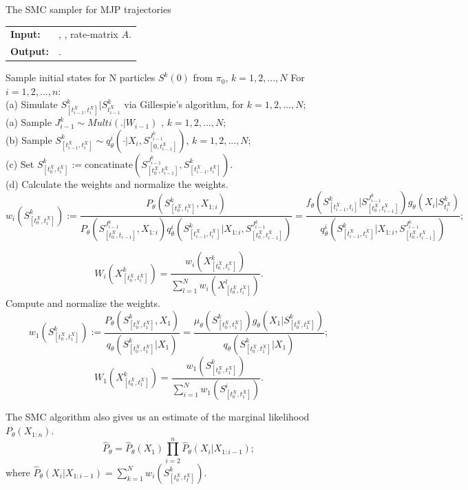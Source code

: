 \begin{algorithm}[H]
  \caption{The SMC sampler for MJP trajectories}
   \label{alg:SMC}
  \begin{tabular}{l l}
   \textbf{Input:  } & \text{Prior $\pi_0$, observations $X$}, 
                       \text{Number of particles $N$}, rate-matrix $A$.\\
   \textbf{Output:  }& \text{New MJP trajectory $S' (t) = (s'_0, S', T')$}.\\
   \hline
   \end{tabular}
   \begin{algorithmic}[1]
\State 
Sample initial states for N particles $S^k(0)$ from $\pi_0$, $k = 1,2,...,N$ 
\State For $i = 1, 2, ..., n$:\\
\noindent \noindent (a) Simulate $S_{[t^X_{i -1},t^X_i]}^k|S^k_{t^X_{i-1}}$ via Gillespie's algorithm, for $k = 1,2,...,N$; \\
\noindent \noindent (a) Sample $J_{i-1}^k \sim Multi(.| W_{i-1})$ , $k = 1,2,...,N$;\\
\noindent \noindent (b) 
Sample $S_{[t^X_{i -1},t^X_i]}^k \sim q_\theta^i(\cdot| X_i, S_{[0, t_{i-1}^X]}^{J_{i-1}^k})$, $k = 1,2,...,N$;\\
\noindent \noindent (c) Set $S_{[t_0^X, t^X_i]}^k := \text{concatinate}(S_{[t_0^X, t^X_{i-1}]}^{J_{i-1}^k}, S_{[t_{i -1}^X,t_i^X]}^k)$.\\
\noindent \noindent (d) Calculate the weights and normalize the weights.
$$w_i(S_{[t_0^X, t^X_i]}^k) := \frac{P_\theta(S_{[t_0^X, t_i^X]}^k, X_{1:i})}{P_\theta(S_{[t_0^X,t_{i-1}]}^{J_{i-1}^k}, X_{1:i})q_\theta^i(S_{[t^X_{i-1}, t_i^X]}^k | X_{1:i},S_{[t_0^X, t_{i-1}^X]}^{J_{i-1}^k} )} = \frac{f_\theta(S_{[t^X_{i-1}, t_i]}^k|S_{[t_0^X, t^X_{i-1}]}^{J_{i-1}^k}) g_\theta(X_i | S_{t_i^X}^k)}{q_\theta^i(S_{[t^X_{i-1}, t_i^X]}^k|X_{1:i},S_{[t_0^X, t^X_{i-1}]}^{J_{i-1}^k})};$$

$$W_i(X_{[t_0^X, t^X_i]}^k) = \frac{w_i(X_{[t_0^X, t_i^X]}^k)}{\sum_{l = 1}^N w_i(X_{[t_0^X, t^X_i]}^l)}.$$
%
%
\noindent Compute and normalize the weights.
$$w_1(S_{[t_0^X, t_1^X]}^k) :=\frac{P_\theta(S_{[t_0^X, t_1^X]}^k, X_1)}{q_\theta(S_{[t_0^X, t_1^X]}^k|X_1)} =  \frac{\mu_\theta(S_{[t_0^X, t_1^X]}^k)g_\theta(X_1|S_{[t_0^X, t_1^X]}^k)}{q_\theta(S_{[t_0^X, t_1^X]}^k|X_1)};$$
$$W_1(X_{[t_0^X, t_1^X]}^k) = \frac{w_1(S_{[t_0^X, t_1^X]}^k)}{\sum_{i = 1}^N w_1(S_{[t_0^X, t_1^X]}^i)}.$$
\end{algorithmic}
\end{algorithm}
The SMC algorithm also gives us an estimate of the marginal likelihood $P_\theta(X_{1:n})$.
$$ \hat{P}_{\theta} = \hat{P}_{\theta}(X_1) \prod_{i = 2}^n \hat{P}_{\theta}(X_i| X_{1: i- 1});$$
where $\hat{P}_{\theta}(X_i| X_{1: i- 1}) = \sum_{k = 1} ^ N w_i(S_{[t_0^X, t_I^X]}^k).$
